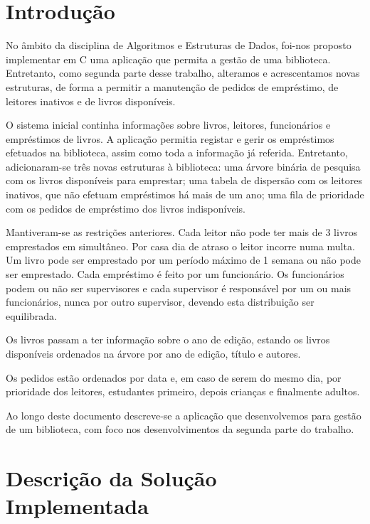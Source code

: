 \documentclass[12pt,a4paper,reqno]{report}
\numberwithin{figure}{section}
\numberwithin{equation}{section}
\def\Cpp{C\raisebox{0.5ex}{\tiny\textbf{++}}}
\begin{document}


\tableofcontents

\chapter{Introdução}

No âmbito da disciplina de Algoritmos e Estruturas de Dados, foi-nos proposto implementar em \Cpp{} uma aplicação que permita a gestão de uma biblioteca. Entretanto, como segunda parte desse trabalho, alteramos e acrescentamos novas estruturas, de forma a permitir a manutenção de pedidos de empréstimo, de leitores inativos e de livros disponíveis.

O sistema inicial continha informações sobre livros, leitores, funcionários e empréstimos de livros. A aplicação permitia registar e gerir os empréstimos efetuados na biblioteca, assim como toda a informação já referida. Entretanto, adicionaram-se três novas estruturas à biblioteca: uma árvore binária de pesquisa com os livros disponíveis para emprestar; uma tabela de dispersão com os leitores inativos, que não efetuam empréstimos há mais de um ano; uma fila de prioridade com os pedidos de empréstimo dos livros indisponíveis.

Mantiveram-se as restrições anteriores. Cada leitor não pode ter mais de 3 livros emprestados em simultâneo. Por casa dia de atraso o leitor incorre numa multa. Um livro pode ser emprestado por um período máximo de 1 semana ou não pode ser emprestado. Cada empréstimo é feito por um funcionário. Os funcionários podem ou não ser supervisores e cada supervisor é responsável por um ou mais funcionários, nunca por outro supervisor, devendo esta distribuição ser equilibrada.

Os livros passam a ter informação sobre o ano de edição, estando os livros disponíveis ordenados na árvore por ano de edição, título e autores.

Os pedidos estão ordenados por data e, em caso de serem do mesmo dia, por prioridade dos leitores, estudantes primeiro, depois crianças e finalmente adultos.

Ao longo deste documento descreve-se a aplicação que desenvolvemos para gestão de um biblioteca, com foco nos desenvolvimentos da segunda parte do trabalho.

\chapter{Descrição da Solução Implementada}
\end{document}

